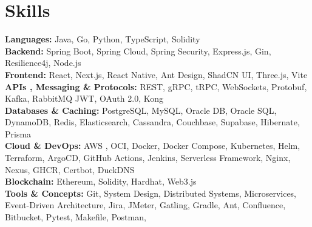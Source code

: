 \section*{Skills}
\BigDivider
\small
\noindent\textbf{Languages:} Java, Go, Python, TypeScript, Solidity\\[0.2em]
\textbf{Backend:} Spring Boot, Spring Cloud, Spring Security, Express.js, Gin, Resilience4j, Node.js\\[0.2em]
\textbf{Frontend:} React, Next.js, React Native, Ant Design, ShadCN UI, Three.js, Vite\\[0.2em]
\textbf{APIs , Messaging \& Protocols:} REST, gRPC, tRPC, WebSockets, Protobuf, Kafka, RabbitMQ JWT, OAuth 2.0, Kong\\[0.2em]
\textbf{Databases \& Caching:} PostgreSQL, MySQL, Oracle DB, Oracle SQL, DynamoDB, Redis, Elasticsearch, Cassandra, Couchbase, Supabase,  Hibernate, Prisma\\[0.2em]
\textbf{Cloud \& DevOps:} AWS , OCI, Docker, Docker Compose, Kubernetes, Helm, Terraform, ArgoCD, GitHub Actions, Jenkins, Serverless Framework, Nginx, Nexus, GHCR, Certbot, DuckDNS\\[0.2em]
\textbf{Blockchain:} Ethereum, Solidity, Hardhat, Web3.js\\[0.2em]
\textbf{Tools \& Concepts:} Git, System Design, Distributed Systems, Microservices, Event-Driven Architecture, Jira, JMeter, Gatling, Gradle, Ant, Confluence, Bitbucket, Pytest, Makefile, Postman, 
\normalsize
